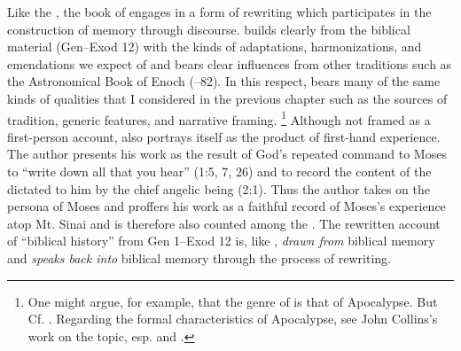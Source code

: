 
\nocite{dillamnn_jbw_kleine}
\nocite{ewald_zkm1844}


Like the \ga, the book of \jub engages in a form of rewriting which participates in the construction of memory through \psgraphical discourse. \jub builds clearly from the biblical material (Gen--Exod 12) with the kinds of adaptations, harmonizations, and emendations we expect of \rwb and bears clear influences from other \secondtemple traditions such as the Astronomical Book of Enoch (--82). In this respect, \jub bears many of the same kinds of qualities that I considered in the previous chapter such as the sources of tradition, generic features, and narrative framing.%
    \footnote{One might argue, for example, that the genre of \jub is that  of Apocalypse. But Cf. \cite{hanneken2012}. Regarding the formal characteristics of Apocalypse, see John Collins's work on the topic, esp. 
        \cite{collins_mason-etal2012} and 
        \cite{collins_semeia1979}.}
Although not framed as a first-person account, \jub also portrays itself as the product of first-hand experience. The author presents his work as the result of God's repeated command to Moses to ``write down all that you hear'' (1:5, 7, 26) and to record the content of the \heavenlytablets dictated to him by the chief angelic being (2:1). Thus the author takes on the persona of Moses and proffers his work as a faithful record of Moses's experience atop Mt. Sinai and is therefore also counted among the \psa. The rewritten account of ``biblical history'' from Gen 1--Exod 12 is, like \ga, \emph{drawn from} biblical memory and \emph{speaks back into} biblical memory through the process of rewriting. 

